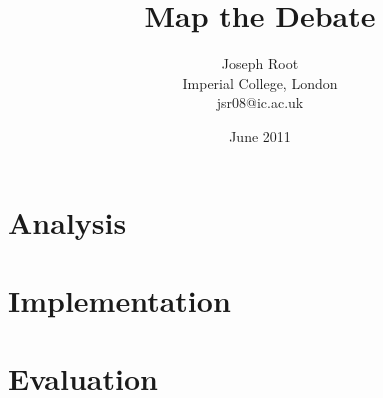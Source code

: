 \documentclass[a4paper,11pt,english]{report}
\author{Joseph Root\\
Imperial College, London\\
jsr08@ic.ac.uk}
\date{June 2011}
\title{Map the Debate}
\begin{document}
	
	
	
	
	
	
	
	\setcounter{tocdepth}{1}
	\tableofcontents
	
	\part{Analysis}
	
	
	
	

	
	\part{Implementation}

	
	
	

	

	
	
	
	
	
	
	
	
	
	
	\part{Evaluation}
	
\end{document}
